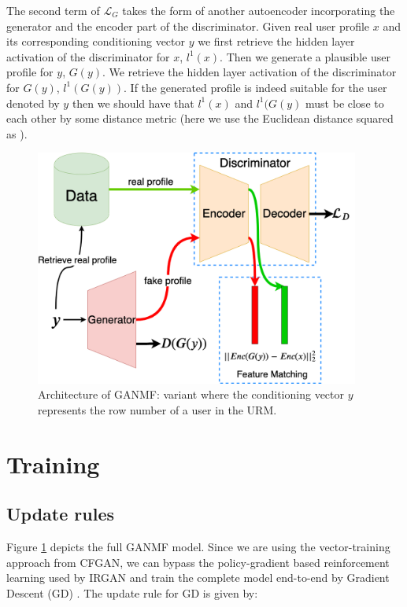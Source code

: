 The second term of $\mathcal{L}_{G}$ takes the form of another autoencoder incorporating the generator and the encoder part of the discriminator. Given real user profile $x$ and its corresponding conditioning vector $y$ we first retrieve the hidden layer activation of the discriminator for $x$, $l^1(x)$. Then we generate a plausible user profile for $y$, $G(y)$. We retrieve the hidden layer activation of the discriminator for $G(y)$, $l^1(G(y))$. If the generated profile is indeed suitable for the user denoted by $y$ then we should have that $l^1(x)$ and $l^1(G(y)$ must be close to each other by some distance metric (here we use the Euclidean distance squared as \cite{salimans2016improved}).

\begin{figure}
    \centering
    \includegraphics[width=0.95\textwidth]{model/full_GANMF.png}
    \caption{Architecture of GANMF: variant where the conditioning vector $y$ represents the row number of a user in the URM.}
    \label{fig:full_ganmf}
\end{figure}

\section{Training}
\subsection{Update rules}
\label{sec:partial_derivatives}
Figure \ref{fig:full_ganmf} depicts the full GANMF model. Since we are using the vector-training approach from CFGAN, we can bypass the policy-gradient based reinforcement learning used by IRGAN and train the complete model end-to-end by Gradient Descent (GD) \cite{rumelhart1986learning}. The update rule for GD is given by:

